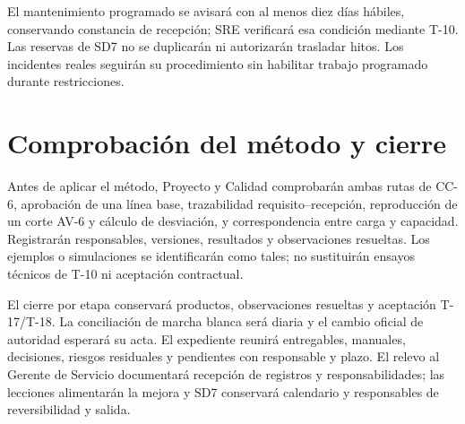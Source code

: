 El mantenimiento programado se avisará con al menos diez días hábiles, conservando constancia de recepción; SRE verificará esa condición mediante T-10. Las reservas de SD7 no se duplicarán ni autorizarán trasladar hitos. Los incidentes reales seguirán su procedimiento sin habilitar trabajo programado durante restricciones. \parencites[cap.~10, restricción 12, p.~26; numeral 13.2, p.~29; cap.~15, RT-10.05, p.~34]{sd6-c07}[art.~20, p.~15]{sd6-ba}[RT-10.05, p.~22]{sd6-bt}


\section{Comprobación del método y cierre}

Antes de aplicar el método, Proyecto y Calidad comprobarán ambas rutas de CC-6, aprobación de una línea base, trazabilidad requisito--recepción, reproducción de un corte AV-6 y cálculo de desviación, y correspondencia entre carga y capacidad. Registrarán responsables, versiones, resultados y observaciones resueltas. Los ejemplos o simulaciones se identificarán como tales; no sustituirán ensayos técnicos de T-10 ni aceptación contractual.

El cierre por etapa conservará productos, observaciones resueltas y aceptación T-17/T-18. La conciliación de marcha blanca será diaria y el cambio oficial de autoridad esperará su acta. El expediente reunirá entregables, manuales, decisiones, riesgos residuales y pendientes con responsable y plazo. El relevo al Gerente de Servicio documentará recepción de registros y responsabilidades; las lecciones alimentarán la mejora y SD7 conservará calendario y responsables de reversibilidad y salida. \parencites[art.~17.3, pp.~12--13]{sd6-ba}[cap.~20, pp.~34--35]{sd6-bt}